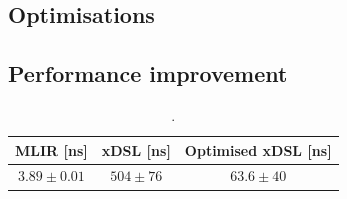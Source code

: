 

\subsection{Optimisations}
\label{sec:specialising-pattern-rewriting-optimisations}










\subsection{Performance improvement}
\label{sec:specialising-pattern-rewriting-performance}


\begin{table}[H]
  \caption{.}
  \label{tab:constant-folding-optimised}
  \centering
  \begin{tabular}{ccc}
    \toprule
    \textbf{MLIR [ns]} & \textbf{xDSL [ns]} & \textbf{Optimised xDSL [ns]} \\
    \midrule
    $3.89 \pm 0.01$ & $504 \pm 76$ & $63.6 \pm 40$\\
    \bottomrule
  \end{tabular}
\end{table}



